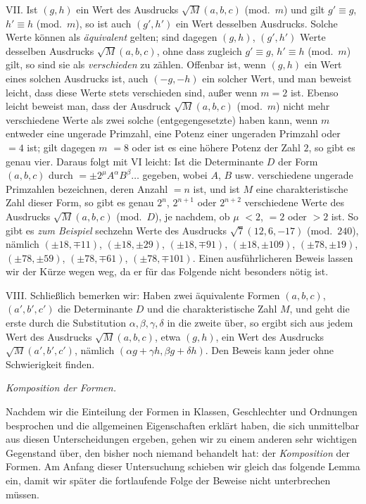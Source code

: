 VII. Ist $(g,h)$ ein Wert des Ausdrucks $\surd M(a,b,c)$ (mod.\ $m$) und gilt $g'\equiv g$, $h'\equiv h$ (mod.\ $m$), so ist auch $(g',h')$ ein Wert desselben Ausdrucks. Solche Werte können als \textit{äquivalent} gelten; sind dagegen $(g,h)$, $(g',h')$ Werte desselben Ausdrucks $\surd M(a,b,c)$, ohne dass zugleich $g'\equiv g$, $h'\equiv h$ (mod.\ $m$) gilt, so sind sie als \textit{verschieden} zu zählen. Offenbar ist, wenn $(g,h)$ ein Wert eines solchen Ausdrucks ist, auch $(-g,-h)$ ein solcher Wert, und man beweist leicht, dass diese Werte stets verschieden sind, außer wenn $m=2$ ist. Ebenso leicht beweist man, dass der Ausdruck $\surd M(a,b,c)$ (mod.\ $m$) nicht mehr verschiedene Werte als zwei solche (entgegengesetzte) haben kann, wenn $m$ entweder eine ungerade Primzahl, eine Potenz einer ungeraden Primzahl oder $=4$ ist; gilt dagegen $m$ $=8$ oder ist es eine höhere Potenz der Zahl $2$, so gibt es genau vier. Daraus folgt mit VI leicht: Ist die Determinante $D$ der Form $(a,b,c)$ durch $=\pm2^\mu A^\alpha B^\beta\ldots$ gegeben, wobei $A$, $B$ usw. verschiedene ungerade Primzahlen bezeichnen, deren Anzahl $=n$ ist, und ist $M$ eine charakteristische Zahl dieser Form, so gibt es genau $2^n$, $2^{n+1}$ oder $2^{n+2}$ verschiedene Werte des Ausdrucks $\surd M(a,b,c)$ (mod.\ $D$), je nachdem, ob $\mu$ $<2$, $=2$ oder $>2$ ist. So gibt es \textit{zum Beispiel} sechzehn Werte des Ausdrucks $\surd7(12,6,-17)$ (mod.\ $240$), nämlich $(\pm18,\mp11)$, $(\pm18,\pm29)$, $(\pm18,\mp91)$, $(\pm18,\pm109)$, $(\pm78,\pm19)$, $(\pm78,\pm59)$, $(\pm78,\mp61)$, $(\pm78,\mp101)$. Einen ausführlicheren Beweis lassen wir der Kürze wegen weg, da er für das Folgende nicht besonders nötig ist.

VIII. Schließlich bemerken wir: Haben zwei äquivalente Formen $(a,b,c)$, $(a',b',c')$ die Determinante $D$ und die charakteristische Zahl $M$, und geht die erste durch die Substitution $\alpha,\beta,\gamma,\delta$ in die zweite über, so ergibt sich aus jedem Wert des Ausdrucks $\surd M(a,b,c)$, etwa $(g,h)$, ein Wert des Ausdrucks $\surd M(a',b',c')$, nämlich $(\alpha g+\gamma h,\beta g+\delta h)$. Den Beweis kann jeder ohne Schwierigkeit finden.

\begin{center}
\textit{Komposition der Formen.}
\end{center}

Nachdem wir die Einteilung der Formen in Klassen, Geschlechter und Ordnungen besprochen und die allgemeinen Eigenschaften erklärt haben, die sich unmittelbar aus diesen Unterscheidungen ergeben, gehen wir zu einem anderen sehr wichtigen Gegenstand über, den bisher noch niemand
behandelt hat: der \textit{Komposition} der Formen. Am Anfang dieser Untersuchung schieben wir gleich das folgende Lemma ein, damit wir später die fortlaufende Folge der Beweise nicht unterbrechen müssen.

